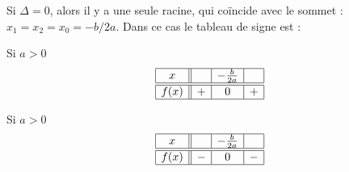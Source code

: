     Si \( \Delta=0\), alors il y a une seule racine, qui coïncide avec le sommet : \( x_1=x_2=x_0=-b/2a\). Dans ce cas le tableau de signe est :
    \begin{multicols}{2}
        \begin{center}
            Si \( a>0\)
    \begin{equation*}
        \begin{array}[]{|c||c|c|c|}
            \hline
            x&&-\frac{ b }{ 2a }&\\
              \hline\hline
              f(x)&+&0&+\\ 
              \hline 
               \end{array}
           \end{equation*}
            
           \columnbreak
            Si \( a>0\)
    \begin{equation*}
        \begin{array}[]{|c||c|c|c|}
            \hline
            x&&-\frac{ b }{ 2a }&\\
              \hline\hline
              f(x)&-&0&-\\ 
              \hline 
               \end{array}
           \end{equation*}
            
        \end{center}
    \end{multicols}

